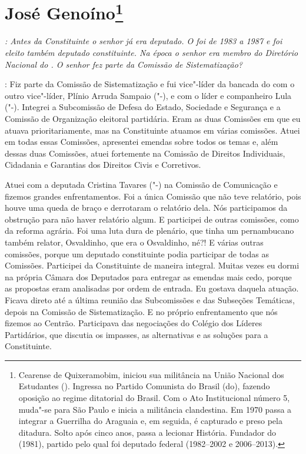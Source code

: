 \chapter{José Genoíno\footnote{Cearense de Quixeramobim, iniciou sua militância na União Nacional dos
Estudantes (). Ingressa no Partido Comunista do Brasil (do),
fazendo oposição ao regime ditatorial do Brasil. Com o Ato Institucional
número 5, muda"-se para São Paulo e inicia a militância clandestina. Em
1970 passa a integrar a Guerrilha do Araguaia e, em seguida, é capturado
e preso pela ditadura. Solto após cinco anos, passa a lecionar História.
Fundador do  (1981), partido pelo qual foi deputado federal (1982--2002
e 2006--2013).}}

\emph{: Antes da Constituinte o senhor já era deputado. O foi de 1983 a
1987 e foi eleito também deputado constituinte. Na época o senhor era
membro do Diretório Nacional do . O senhor fez parte da Comissão de
Sistematização?}

: Fiz parte da Comissão de Sistematização e fui vice"-líder
da bancada do  com o outro vice"-líder, Plínio
Arruda Sampaio ("-),
e com o líder e companheiro Lula ("-). Integrei a Subcomissão de
Defesa do Estado, Sociedade e Segurança e a Comissão de Organização
eleitoral partidária. Eram as duas Comissões em que eu atuava
prioritariamente, mas na Constituinte atuamos em várias comissões. Atuei
em todas essas Comissões, apresentei emendas sobre todos os temas e,
além dessas duas Comissões, atuei fortemente na Comissão de Direitos
Individuais, Cidadania e Garantias dos Direitos Civis e Corretivos.

Atuei com a deputada Cristina Tavares ("-) na Comissão de
Comunicação e fizemos grandes enfrentamentos. Foi a única Comissão que
não teve relatório, pois houve uma queda de braço e derrotaram o
relatório dela. Nós participamos da obstrução para não haver relatório
algum. E participei de outras comissões, como da reforma agrária. Foi
uma luta dura de plenário, que tinha um pernambucano também relator,
Osvaldinho, que era o Osvaldinho, né?! E várias outras comissões,
porque um deputado constituinte podia participar de todas as Comissões.
Participei da Constituinte de maneira integral. Muitas vezes eu dormi na
própria Câmara dos Deputados para entregar as emendas mais cedo, porque
as propostas eram analisadas por ordem de entrada. Eu gostava daquela
atuação. Ficava direto até a última reunião das Subcomissões e das
Subseções Temáticas, depois na Comissão de Sistematização. E no próprio
enfrentamento que nós fizemos ao Centrão. Participava das negociações do
Colégio dos Líderes Partidários, que discutia os impasses, as
alternativas e as soluções para a Constituinte.

